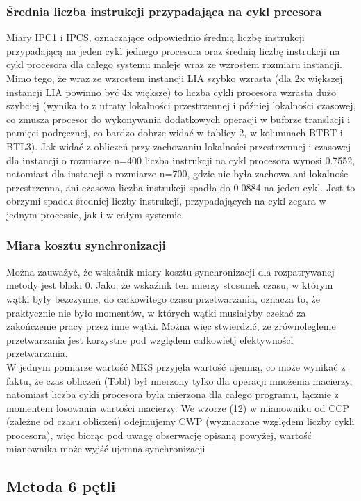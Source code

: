 \documentclass[10pt,a4paper]{article}
\begin{document}
\subsubsection*{Średnia liczba instrukcji przypadająca na cykl prcesora}
Miary IPC1 i IPCS, oznaczające odpowiednio średnią liczbę instrukcji przypadającą na jeden cykl jednego procesora
oraz średnią liczbę instrukcji na cykl procesora dla całego systemu maleje wraz ze wzrostem rozmiaru instancji.
Mimo tego, że wraz ze wzrostem instancji LIA szybko wzrasta (dla 2x większej instancji LIA powinno być 4x większe) to 
liczba cykli procesora wzrasta dużo szybciej (wynika to z utraty lokalności przestrzennej i później lokalności czasowej, 
co zmusza procesor do wykonywania dodatkowych operacji w buforze translacji i pamięci podręcznej, co bardzo dobrze widać w 
tablicy 2, w kolumnach BTBT i BTL3). Jak widać z obliczeń przy zachowaniu lokalności przestrzennej i czasowej dla 
instancji o rozmiarze n=400 liczba instrukcji na cykl procesora wynosi 0.7552, natomiast dla instancji o rozmiarze n=700, 
gdzie nie była zachowa ani lokalnośc przestrzenna, ani czasowa liczba instrukcji spadła do 0.0884 na jeden cykl. Jest to 
obrzymi spadek średniej liczby instrukcji, przypadających na cykl zegara w jednym processie, jak i w całym systemie.

\subsubsection*{Miara kosztu synchronizacji}
Można zauważyć, że wskażnik miary kosztu synchronizacji dla rozpatrywanej metody jest bliski 0. Jako, że 
wskaźnik ten mierzy stosunek czasu, w którym wątki były bezczynne, do całkowitego czasu przetwarzania, oznacza
to, że praktycznie nie było momentów, w których wątki musiałyby czekać za zakończenie pracy przez inne wątki. 
Można więc stwierdzić, że zrównoleglenie przetwarzania jest korzystne pod względem całkowietj efektywności przetwarzania.\\
W jednym pomiarze wartość MKS przyjęła wartość ujemną, co może wynikać z faktu, że czas obliczeń (Tobl) był mierzony tylko 
dla operacji mnożenia macierzy, natomiast liczba cykli procesora była mierzona dla całego programu, łącznie z momentem
losowania wartości macierzy. We wzorze (12) w mianowniku od CCP (zależne od czasu obliczeń) odejmujemy CWP (wyznaczane 
względem liczby cykli procesora), więc biorąc pod uwagę obserwację opisaną powyżej, wartość mianownika może wyjść ujemna.synchronizacji

\subsection{Metoda 6 pętli}
\end{document}
